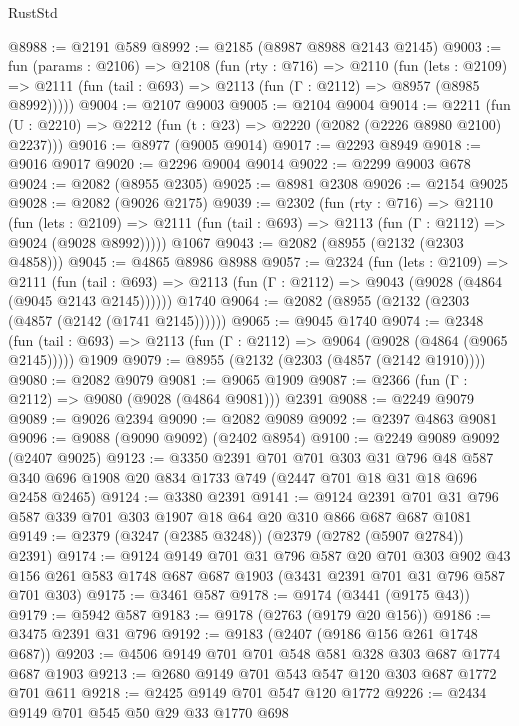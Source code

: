 \begin{lexlean}{RustStd}
\begin{coremodule}
@8988 := @2191 @589
@8992 := @2185 (@8987 @8988 @2143 @2145)
@9003 := fun (params : @2106) =>
  @2108
    (fun (rty : @716) =>
    @2110
      (fun (lets : @2109) =>
      @2111 (fun (tail : @693) => @2113 (fun (Γ : @2112) => @8957 (@8985 @8992)))))
@9004 := @2107 @9003
@9005 := @2104 @9004
@9014 := @2211 (fun (U : @2210) => @2212 (fun (t : @23) => @2220 (@2082 (@2226 @8980 @2100) @2237)))
@9016 := @8977 (@9005 @9014)
@9017 := @2293 @8949
@9018 := @9016 @9017
@9020 := @2296 @9004 @9014
@9022 := @2299 @9003 @678
@9024 := @2082 (@8955 @2305)
@9025 := @8981 @2308
@9026 := @2154 @9025
@9028 := @2082 (@9026 @2175)
@9039 := @2302
    (fun (rty : @716) =>
    @2110
      (fun (lets : @2109) =>
      @2111 (fun (tail : @693) => @2113 (fun (Γ : @2112) => @9024 (@9028 @8992)))))
    @1067
@9043 := @2082 (@8955 (@2132 (@2303 @4858)))
@9045 := @4865 @8986 @8988
@9057 := @2324
    (fun (lets : @2109) =>
    @2111
      (fun (tail : @693) => @2113 (fun (Γ : @2112) => @9043 (@9028 (@4864 (@9045 @2143 @2145))))))
    @1740
@9064 := @2082 (@8955 (@2132 (@2303 (@4857 (@2142 (@1741 @2145))))))
@9065 := @9045 @1740
@9074 := @2348
    (fun (tail : @693) => @2113 (fun (Γ : @2112) => @9064 (@9028 (@4864 (@9065 @2145)))))
    @1909
@9079 := @8955 (@2132 (@2303 (@4857 (@2142 @1910))))
@9080 := @2082 @9079
@9081 := @9065 @1909
@9087 := @2366 (fun (Γ : @2112) => @9080 (@9028 (@4864 @9081))) @2391
@9088 := @2249 @9079
@9089 := @9026 @2394
@9090 := @2082 @9089
@9092 := @2397 @4863 @9081
@9096 := @9088 (@9090 @9092) (@2402 @8954)
@9100 := @2249 @9089 @9092 (@2407 @9025)
@9123 := @3350
    @2391
    @701
    @701
    @303
    @31
    @796
    @48
    @587
    @340
    @696
    @1908
    @20
    @834
    @1733
    @749
    (@2447 @701 @18 @31 @18 @696 @2458 @2465)
@9124 := @3380 @2391
@9141 := @9124 @2391 @701 @31 @796 @587 @339 @701 @303 @1907 @18 @64 @20 @310 @866 @687 @687 @1081
@9149 := @2379 (@3247 (@2385 @3248)) (@2379 (@2782 (@5907 @2784)) @2391)
@9174 := @9124
    @9149
    @701
    @31
    @796
    @587
    @20
    @701
    @303
    @902
    @43
    @156
    @261
    @583
    @1748
    @687
    @687
    @1903
    (@3431 @2391 @701 @31 @796 @587 @701 @303)
@9175 := @3461 @587
@9178 := @9174 (@3441 (@9175 @43))
@9179 := @5942 @587
@9183 := @9178 (@2763 (@9179 @20 @156))
@9186 := @3475 @2391 @31 @796
@9192 := @9183 (@2407 (@9186 @156 @261 @1748 @687))
@9203 := @4506 @9149 @701 @701 @548 @581 @328 @303 @687 @1774 @687 @1903
@9213 := @2680 @9149 @701 @543 @547 @120 @303 @687 @1772 @701 @611
@9218 := @2425 @9149 @701 @547 @120 @1772
@9226 := @2434 @9149 @701 @545 @50 @29 @33 @1770 @698

\end{coremodule}
\end{lexlean}
